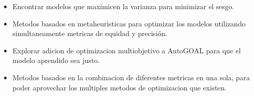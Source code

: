 \begin{itemize}
    \item Encontrar modelos que maximicen la varianza para minimizar el sesgo.
    \item Metodos basados en metaheuristicas para optimizar los modelos utilizando simultaneamente metricas de equidad y precisión.
    \item Explorar adicion de optimizacion multiobjetivo a AutoGOAL para que el modelo aprendido sea justo.
    \item Metodos basados en la combinacion de diferentes metricas en una sola, para poder aprovechar los multiples metodos de optimizacion que existen.
\end{itemize}
